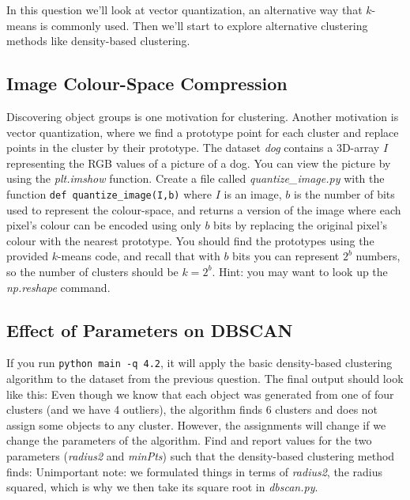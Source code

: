 \documentclass{article}
\begin{document}
In this question we'll look at vector quantization, an alternative way that $k$-means is commonly used. Then we'll start to explore alternative clustering methods like density-based clustering.

\subsection{Image Colour-Space Compression}

Discovering object groups is one motivation for clustering. Another motivation is vector quantization, where we find a prototype point for each cluster and replace points in the cluster by their prototype.
The dataset \emph{dog} contains a 3D-array $I$ representing the RGB values of a picture of a dog. You can view the picture by using the \emph{plt.imshow} function. Create a file called \emph{quantize\_image.py} with the function \verb|def quantize_image(I,b)| where $I$ is an image, $b$ is the number of bits used to represent the colour-space, and returns a version of the image where each pixel's colour can be encoded using only $b$ bits by replacing the original pixel's colour with the nearest prototype. You should find the prototypes using the provided $k$-means code, and recall that with $b$ bits you can represent $2^b$ numbers, so the number of clusters should be $k = 2^b$. Hint: you may want to look up the \emph{np.reshape} command.

\subsection{Effect of Parameters on DBSCAN}

If you run \verb|python main -q 4.2|, it will apply the basic density-based clustering algorithm to the dataset from the previous question. The final output should look like this:
Even though we know that each object was generated from one of four clusters (and we have 4 outliers), the algorithm finds 6 clusters and does not assign some objects to any cluster. However, the assignments will change if we change the parameters of the algorithm. Find and report values for the two parameters (\emph{radius2} and \emph{minPts}) such that the density-based clustering method finds:
Unimportant note: we formulated things in terms of \emph{radius2}, the radius squared, which is why we then take its square root in \emph{dbscan.py}. 
\end{document}
